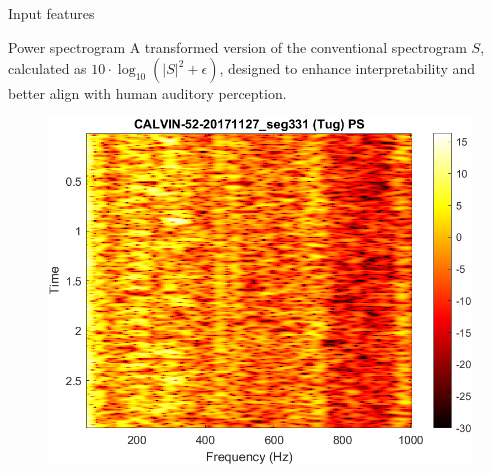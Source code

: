 \documentclass[]{beamer}
\begin{document}


\begin{frame}{Input features}
    \small
    \begin{exampleblock}{Power spectrogram}
    A transformed version of the conventional spectrogram $S$, calculated as $10 \cdot \log_{10}(|S|^2 + \epsilon)$, designed to enhance interpretability and better align with human auditory perception.
    \end{exampleblock}

    \begin{figure}
        \centering
        \includegraphics[width=0.5\linewidth]{img/Tug.png}
    \end{figure}

\end{frame}
\end{document}
